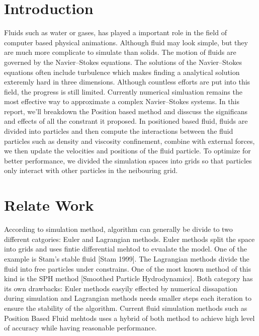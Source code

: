 \documentclass[acmtog]{acmart}
\begin{document}




\maketitle

\section{Introduction}
Fluids such as water or gases, has played a important role in the field of 
computer based physical animations. Although fluid may look simple, but they are much
more complicate to simulate than solids. The motion of fluids are governed by the 
Navier–Stokes equations. The solutions of the Navier–Stokes equations often 
include turbulence which makes finding a analytical solution exteremly hard in three dimensions.
Although countless efforts are put into this field, the progress is still limited. 
Currently numerical simluation remains the most effective way to approximate a complex 
Navier–Stokes systems. In this report, we'll breakdown the Position based method and disscuss 
the significans and effects of all the constrant it proposed. In positioned based fluid, 
fluids are divided into particles and then compute the interactions between the fluid particles such as
density and viscosity confinement, combine with external forces, we then update the velocities and positions 
of the fluid particle. To optimize for better performance, we divided the simulation spaces into grids so that particles only
interact with other particles in the neibouring grid.


\section{Relate Work}
According to simulation method, algorithm can generally be divide to two different catgories: 
Euler and Lagrangian methods. Euler methods split the space into grids and uses 
fintie differential mehtod to evualate the model. One of the example is Stam's stable fluid [Stam 1999].
The Lagrangian methods divide the fluid into free particles under constrains. One of the most known method of this 
kind is the SPH method [Smoothed Particle Hydrodynamics]. Both category has its own drawbacks: Euler methods easyily 
effected by numerical dissapation during simulation and Lagrangian methods needs smaller steps each iteration to ensure
the stability of the algorithm. Current fluid simulation methods such as Position Based Fluid mehtods uses a hybrid of both method 
to achieve high level of accuracy while having reasonable performance.
\end{document}
